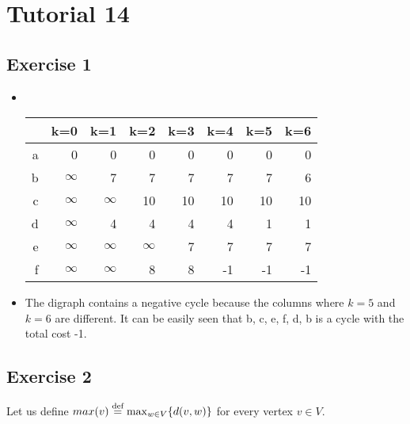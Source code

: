 \documentclass[english]{article}
\begin{document}

\pagestyle{fancy}
 \chead{}


\section*{Tutorial 14}

\subsection*{Exercise 1}
\begin{itemize}
\item \mbox{} \\
\begin{tabular}{r|rrrrrrr}
  & k=0 & k=1 & k=2 & k=3 & k=4 & k=5 & k=6\\
\hline
a &	0 & 0 & 0 & 0 & 0 & 0 & 0\\ 
b &	$\infty$ & 7 & 7 & 7 & 7 & 7 & 6\\ 
c &	$\infty$ & $\infty$ & 10 & 10 & 10 & 10 & 10\\ 
d &	$\infty$ & 4 & 4 & 4 & 4 & 1 & 1\\ 
e &	$\infty$ & $\infty$ & $\infty$ & 7 & 7 & 7 & 7\\ 
f &	$\infty$ & $\infty$ & 8 & 8 & -1 & -1 & -1\\ 
\end{tabular}
\item The digraph contains a negative cycle because the columns where
 $k=5$ and $k=6$ are different. It can be easily seen that
b, c, e, f, d, b is a cycle with the total cost -1.
\end{itemize}

\subsection*{Exercise 2}

Let us define
$max(v)\stackrel{\mbox{\scriptsize def}}{=} \max_{w \in V} \{d(v,w)\}$
for every vertex $v \in V$.
\end{document}
